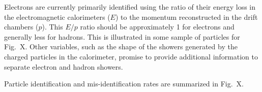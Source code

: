 Electrons are currently primarily identified using the ratio of their energy loss in the electromagnetic calorimeters ($E$) to the momentum reconstructed in the drift chambers ($p$).  This $E/p$ ratio should be approximately 1 for electrons and generally less for hadrons.  This is illustrated in some sample of particles for Fig.~X.  Other variables, such as the shape of the showers generated by the charged particles in the calorimeter, promise to provide additional information to separate electron and hadron showers.

Particle identification and mis-identification rates are summarized in Fig.~X.

